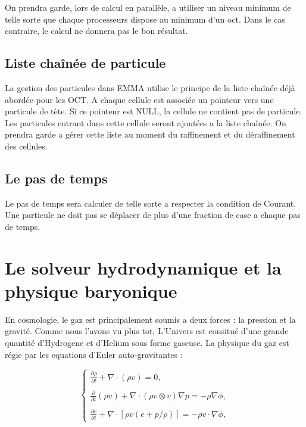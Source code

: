 On prendra garde, lors de calcul en parallèle, a utiliser un niveau minimum de telle sorte que chaque processeurs dispose au minimum d'un oct.
Dans le cas contraire, le calcul ne donnera pas le bon résultat.

\subsection{Liste chaînée de particule}
La gestion des particules dans EMMA utilise le principe de la liste chaînée déjà abordée pour les OCT. %
A chaque cellule est associée  un pointeur vers une particule de tète.
Si ce pointeur est NULL, la cellule ne contient pas de particule.
Les particules entrant dans cette cellule seront ajoutées a la liste chaînée.
On prendra garde a gérer cette liste au moment du raffinement et du déraffinement des cellules.



\subsection{Le pas de temps}

Le pas de temps sera calculer de telle sorte a respecter la condition de Courant.
Une particule ne doit pas se déplacer de plus d'une fraction de case a chaque pas de temps.


%



\section{Le solveur hydrodynamique et la physique baryonique}



En cosmologie, le gaz est principalement soumis a deux forces : la pression et la gravité.
Comme nous l'avons vu plus tot, L'Univers est consitué d'une grande quantité d'Hydrogene et d'Helium sous forme gaseuse.
La physique du gaz est régie par les equations d'Euler auto-gravitantes :

\begin{equation}
\begin{cases}

{ \frac{ \partial \rho }{ \partial t } + \nabla \cdot (\rho v) = 0}, \\
\\
{ \frac{ \partial }{ \partial t } (\rho v) + \nabla \cdot (\rho v \otimes v ) \nabla p = -\rho\nabla \phi }, \\
\\
{ \frac{ \partial e }{ \partial t } + \nabla \cdot [ \rho v (e+p/\rho) ] = -\rho v \cdot \nabla \phi },

\end{cases}
\end{equation}
\label{eq:hydro}

